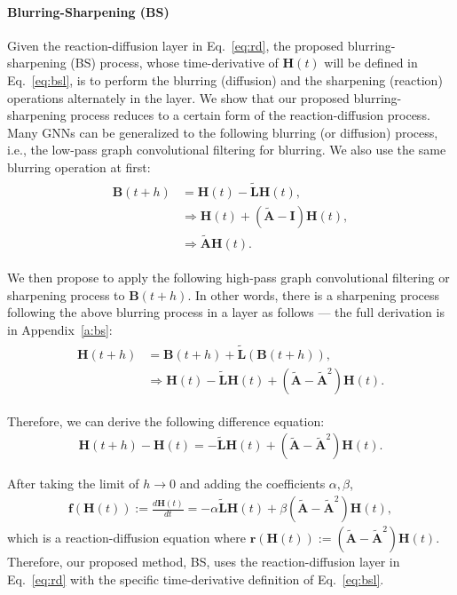 \documentclass{article}
\theoremstyle{plain}
\theoremstyle{definition}
\theoremstyle{remark}
\begin{document}
\paragraph{Blurring-Sharpening (BS)} Given the reaction-diffusion layer in Eq.~\eqref{eq:rd}, the proposed blurring-sharpening (BS) process, whose time-derivative of $\mathbf{H}(t)$ will be defined in Eq.~\eqref{eq:bsl}, is to perform the blurring (diffusion) and the sharpening (reaction) operations alternately in the layer. 
We show that our proposed blurring-sharpening process reduces to a certain form of the reaction-diffusion process. Many GNNs can be generalized to the following blurring (or diffusion) process, i.e., the low-pass graph convolutional filtering for blurring. We also use the same blurring operation at first:
\begin{align}\begin{split}\label{eq:blur}
    \mathbf{B}(t+h) &= \mathbf{H}(t) -\tilde{\mathbf{L}}\mathbf{H}(t),\\
            &\Rightarrow \mathbf{H}(t) + (\tilde{\mathbf{A}}-\mathbf{I})\mathbf{H}(t),\\
            &\Rightarrow \tilde{\mathbf{A}}\mathbf{H}(t).
\end{split}\end{align}

We then propose to apply the following high-pass graph convolutional filtering or sharpening process to $\mathbf{B}(t+h)$. In other words, there is a sharpening process following the above blurring process in a layer as follows --- the full derivation is in Appendix~\ref{a:bs}:
\begin{align}\begin{split}\label{eq:bs}
    \mathbf{H}(t+h) &= \mathbf{B}(t+h) + \tilde{\mathbf{L}}(\mathbf{B}(t+h)),\\
&\Rightarrow \mathbf{H}(t) - \tilde{\mathbf{L}}\mathbf{H}(t) + (\tilde{\mathbf{A}}-\tilde{\mathbf{A}}^2)\mathbf{H}(t).
\end{split}\end{align}

Therefore, we can derive the following difference equation:
\begin{align}
    \mathbf{H}(t+h) - \mathbf{H}(t) = - \tilde{\mathbf{L}}\mathbf{H}(t) + (\tilde{\mathbf{A}}-\tilde{\mathbf{A}}^2)\mathbf{H}(t).
\end{align}

After taking the limit of $h \rightarrow 0$ and adding the coefficients $\alpha, \beta$,
\begin{align}\label{eq:bsl}
   \mathbf{f}(\mathbf{H}(t)) :=  \frac{d \mathbf{H}(t)}{dt} = -\alpha \tilde{\mathbf{L}}\mathbf{H}(t) + \beta(\tilde{\mathbf{A}}-\tilde{\mathbf{A}}^2)\mathbf{H}(t),
\end{align}which is a reaction-diffusion equation where $\mathbf{r}(\mathbf{H}(t)) := (\tilde{\mathbf{A}}-\tilde{\mathbf{A}}^2)\mathbf{H}(t)$. Therefore, our proposed method, BS, uses the reaction-diffusion layer in Eq.~\eqref{eq:rd} with the specific time-derivative definition of Eq.~\eqref{eq:bsl}.
\end{document}
